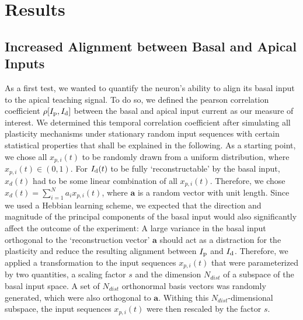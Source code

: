 \documentclass[10pt,a4paper,twocolumn]{article}
\begin{document}
		\section{Results}
		\label{sect:results}
		
		\subsection{Increased Alignment between Basal and Apical Inputs}
		\label{sect:alignment}
		
		As a first test, we wanted to quantify the neuron's ability to 
		align its basal input to the apical teaching signal.
		To do so, we defined the pearson correlation coefficient
		$\rho[I_{\rm p},I_{\rm d}]$ between the basal and apical input current
		as our measure of interest. We determined this temporal
		correlation coefficient after simulating all plasticity mechanisms
		under stationary random input sequences with certain statistical
		properties that shall be explained in the following.
		As a starting point, we chose all $x_{p,i}(t)$ to be randomly
		drawn from a uniform distribution, where $x_{p,i}(t) \in (0,1)$.
		For $I_{\rm d}(t)$ to be fully `reconstructable' by the basal input, 
		$x_d(t)$ had to be some linear combination of all $x_{p,i}(t)$.
		Therefore, we chose $x_d(t) = \sum_{i=1}^N a_i x_{p,i}(t)$, where
		$\mathbf{a}$ is a random vector with unit length.
		Since we used a Hebbian learning scheme, we expected that 
		the direction and magnitude of the principal components of 
		the basal input would also significantly affect the outcome of
		the experiment: A large variance in the basal input 
		orthogonal to the `reconstruction vector' $\mathbf{a}$ 
		should act as a distraction for the plasticity and reduce the
		resulting alignment between $I_{\rm p}$ and $I_{\rm d}$. Therefore, we 
		applied a transformation to the input sequences $x_{p,i}(t)$
		that were parameterized by two quantities, a scaling factor $s$
		and the dimension $N_{dist}$ of a subspace of the basal input space.
		A set of $N_{dist}$ orthonormal basis vectors was randomly generated,
		which were also orthogonal to $\mathbf{a}$. Withing this $N_{dist}$-dimensional
		subspace, the input sequences $x_{p,i}(t)$ were then rescaled by the
		factor $s$. 
		
\end{document}
